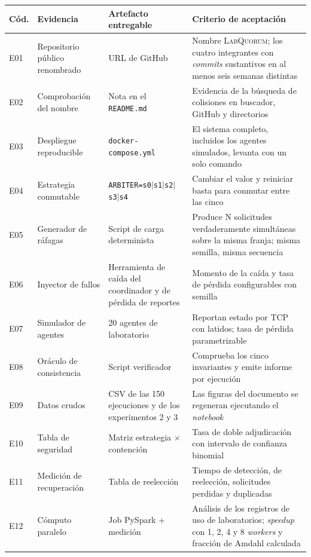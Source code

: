 \documentclass[11pt,a4paper]{article}
\begin{document}
\begin{center}
	\footnotesize
	\begin{longtable}{@{}p{0.9cm}p{4.6cm}p{4.2cm}p{5.0cm}@{}}
		\toprule
		\textbf{Cód.} & \textbf{Evidencia} & \textbf{Artefacto entregable} & \textbf{Criterio de aceptación} \\
		\midrule
		\endhead
		E01 & Repositorio público renombrado & URL de GitHub & Nombre \textsc{LabQuorum}; los cuatro integrantes con \emph{commits} sustantivos en al menos seis semanas distintas \\
		E02 & Comprobación del nombre & Nota en el \texttt{README.md} & Evidencia de la búsqueda de colisiones en buscador, GitHub y directorios \\
		E03 & Despliegue reproducible & \texttt{docker-compose.yml} & El sistema completo, incluidos los agentes simulados, levanta con un solo comando \\
		E04 & Estrategia conmutable & \texttt{ARBITER=s0$\mid$s1$\mid$s2$\mid$s3$\mid$s4} & Cambiar el valor y reiniciar basta para conmutar entre las cinco \\
		E05 & Generador de ráfagas & Script de carga determinista & Produce N solicitudes verdaderamente simultáneas sobre la misma franja; misma semilla, misma secuencia \\
		E06 & Inyector de fallos & Herramienta de caída del coordinador y de pérdida de reportes & Momento de la caída y tasa de pérdida configurables con semilla \\
		E07 & Simulador de agentes & 20 agentes de laboratorio & Reportan estado por TCP con latidos; tasa de pérdida parametrizable \\
		E08 & Oráculo de consistencia & Script verificador & Comprueba los cinco invariantes y emite informe por ejecución \\
		E09 & Datos crudos & CSV de las 150 ejecuciones y de los experimentos 2 y 3 & Las figuras del documento se regeneran ejecutando el \emph{notebook} \\
		E10 & Tabla de seguridad & Matriz estrategia $\times$ contención & Tasa de doble adjudicación con intervalo de confianza binomial \\
		E11 & Medición de recuperación & Tabla de reelección & Tiempo de detección, de reelección, solicitudes perdidas y duplicadas \\
		E12 & Cómputo paralelo & Job PySpark + medición & Análisis de los registros de uso de laboratorios; \emph{speedup} con 1, 2, 4 y 8 \emph{workers} y fracción de Amdahl calculada \\

\end{longtable}
\end{center}
\end{document}
